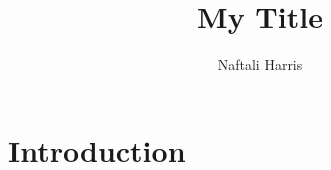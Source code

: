 \documentclass[twoside,11pt]{article}
\begin{document}
\title{My Title}
\author{Naftali Harris} 
\maketitle

\begin{abstract}
\end{abstract}

\section{Introduction}
\end{document}
